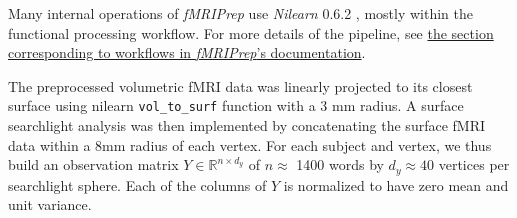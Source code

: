 \begin{description}
\end{description}

Many internal operations of \emph{fMRIPrep} use \emph{Nilearn} 0.6.2
\citep[RRID:SCR\_001362]{nilearn}, mostly within the functional
processing workflow. For more details of the pipeline, see
\href{https://fmriprep.readthedocs.io/en/latest/workflows.html}{the
section corresponding to workflows in \emph{fMRIPrep}'s documentation}.


The preprocessed volumetric fMRI data was linearly projected to its closest surface
using nilearn \texttt{vol\_to\_surf} function with a 3 mm radius. A surface searchlight
analysis was then implemented by concatenating the surface
fMRI data within a 8mm radius of each vertex. For each subject and vertex, we
thus build an observation matrix $Y \in \mathbb{R}^{n \times d_y}$ of $n\approx$ 1400 words
by $d_y\approx40$ vertices per searchlight sphere. Each
of the columns of $Y$ is normalized to have zero mean and unit variance.

